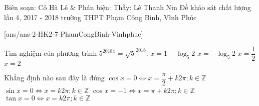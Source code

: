 
\begin{name}
{Biên soạn: Cô Hà Lê \& Phản biện: Thầy: Lê Thanh Nin}
{Đề khảo sát chất lượng lần 4, 2017 - 2018 trường THPT Phạm Công Bình, Vĩnh Phúc}
\end{name}
\setcounter{ex}{0}\setcounter{bt}{0}
[ans/ans-2-HK2-7-PhamCongBinh-Vinhphuc]
\begin{ex}%
	Tìm nghiệm của phương trình $5^{2018x}=\sqrt{5}^{2018}$.
	\choice
	{$x=1-\log_5 2$}
	{$x=-\log_5 2$}
	{\True $x=\dfrac{1}{2}$}
	{$x=2$}
	\end{ex}

\begin{ex}%
	Khẳng định nào sau đây là đúng
	\choice
	{$\cos x =0 \Leftrightarrow x =\dfrac{\pi}{2} +k2\pi; k \in \mathbb{Z}$}
	{$\sin x =0 \Leftrightarrow x = k2\pi; k \in \mathbb{Z}$}
	{\True $\cos x =-1 \Leftrightarrow x =\pi +k2 \pi; k \in \mathbb{Z}$}
	{$\tan x =0 \Leftrightarrow x = k 2\pi; k \in \mathbb{Z}$}
	\end{ex}

